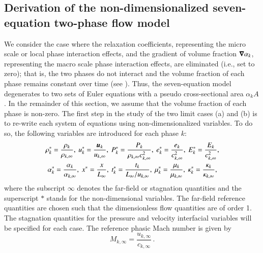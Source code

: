 \documentclass[preprint,10pt]{elsarticle}
\begin{document}
\subsection{Derivation of the non-dimensionalized seven-equation two-phase flow model}\label{sec:scaled-SEM}
We consider the case where the relaxation coefficients, representing the micro scale or local phase interaction effects, 
and the gradient of volume fraction $\boldsymbol\nabla \alpha_k$, representing the macro scale phase interaction effects, are eliminated (i.e., set to zero); that is, 
the two phases do not interact and the volume fraction of each phase remains constant over time (see ). 
Thus, the seven-equation model degenerates to two sets of Euler equations with a pseudo cross-sectional area $\alpha_k A$. In 
the remainder of this section, we assume that the volume fraction of each phase is non-zero.
%
The first step in the study of the two limit cases (a) and (b) is to re-write each system of equations using non-dimensionalized 
variables. To do so, the following variables are introduced for each phase $k$:
%
\begin{multline}
\label{eq:norm_param}
\rho_k^*   = \frac{\rho_k}{\rho_{k,\infty}}           ,\
u_k^*      = \frac{\boldsymbol u_k}{u_{k,\infty}}                 ,\
P_k^*      = \frac{P_k}{\rho_{k,\infty} c^2_{k,\infty}}   ,\
e_k^*      = \frac{e_k}{c^2_{k,\infty} }              , \
E_k^*      = \frac{E_k}{c^2_{k,\infty} }              , \\
\alpha_k^*      = \frac{\alpha_k}{\alpha_{k,\infty} }              , \
x^* = \frac{x}{L_\infty}                      ,\
t_k^* = \frac{t_k}{L_\infty / u_{k,\infty}}           ,\
\mu_k^*    = \frac{\mu_k}{\mu_{k,\infty}}             ,\
\kappa_k^* = \frac{\kappa_k}{\kappa_{k,\infty}}       ,
\end{multline}
%
where  the subscript $\infty$ denotes the far-field or stagnation quantities and the superscript $*$ stands for the non-dimensional variables.
The far-field reference quantities are chosen such that the dimensionless flow quantities are of order 1. The stagnation quantities for 
the pressure and velocity interfacial variables will be specified for each case. The reference phasic Mach number is given by
%
\begin{equation}
M_{k,\infty} = \frac{u_{k,\infty}}{c_{k,\infty}} \,.
\end{equation}
\end{document}

